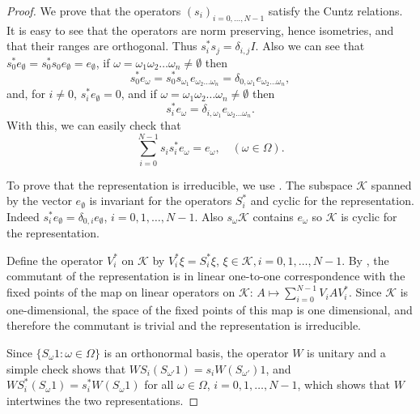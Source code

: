 \documentclass[11pt]{amsart}
\theoremstyle{definition}
\theoremstyle{remark}
\numberwithin{equation}{section}
\def\ty{\emptyset}
\begin{document}
\begin{proof}
We prove that the operators $(s_i)_{i=0,\dots,N-1}$ satisfy the Cuntz relations. It is easy to see that the operators are norm preserving, hence isometries, and that their ranges are orthogonal. Thus $s_i^*s_j=\delta_{i,j}I$. Also we can see that
$s_0^*e_{\ty}=s_0^*s_0e_{\ty}=e_{\ty}$, if $\omega=\omega_1\omega_2\dots\omega_n\neq\ty$ then $$s_0^*e_\omega=s_0^*s_{\omega_1}e_{\omega_2\dots\omega_n}=\delta_{0,\omega_1}e_{\omega_2\dots\omega_n},$$
and, for $i\neq 0$, $s_i^*e_\ty=0$, and if $\omega=\omega_1\omega_2\dots\omega_n\neq\ty$ then
$$s_i^*e_{\omega}=\delta_{i,\omega_1}e_{\omega_2\dots\omega_n}.$$
With this, we can easily check that
$$\sum_{i=0}^{N-1}s_is_i^*e_{\omega}=e_{\omega},\quad(\omega\in\Omega).$$

To prove that the representation is irreducible, we use \cite[Theorem 5.1]{BJK00}. The subspace $\mathcal K$ spanned by the vector $e_\ty$ is invariant for the operators $S_i^*$ and cyclic for the representation. Indeed $s_i^*e_\ty=\delta_{0,i}e_\ty$, $i=0,1,\dots,N-1$. Also $s_\omega\mathcal K$ contains $e_\omega$ so $\mathcal K$ is cyclic for the representation.

Define the operator $V_i^*$ on $\mathcal K$ by $V_i^*\xi=S_i^*\xi$, $\xi\in \mathcal K, i=0,1,\dots,N-1$. By \cite[Theorem 5.1]{BJK00}, the commutant of the representation is in linear one-to-one correspondence with the fixed points of the map on linear operators on $\mathcal K$: $A\mapsto \sum_{i=0}^{N-1}V_iAV_i^*$. Since $\mathcal K$ is one-dimensional, the space of the fixed points of this map is one dimensional, and therefore the commutant is trivial and the representation is irreducible.

Since $\{S_\omega 1 :\omega\in\Omega\}$ is an orthonormal basis, the operator $W$ is unitary and a simple check shows that $WS_i(S_{\omega'}1)=s_i W(S_{\omega'})1$, and   $WS_i^*(S_{\omega}1)=s_i^* W(S_{\omega}1)$ for all $\omega\in\Omega$, $i=0,1,\dots,N-1$, which shows that $W$ intertwines the two representations.
\end{proof}
\end{document}
